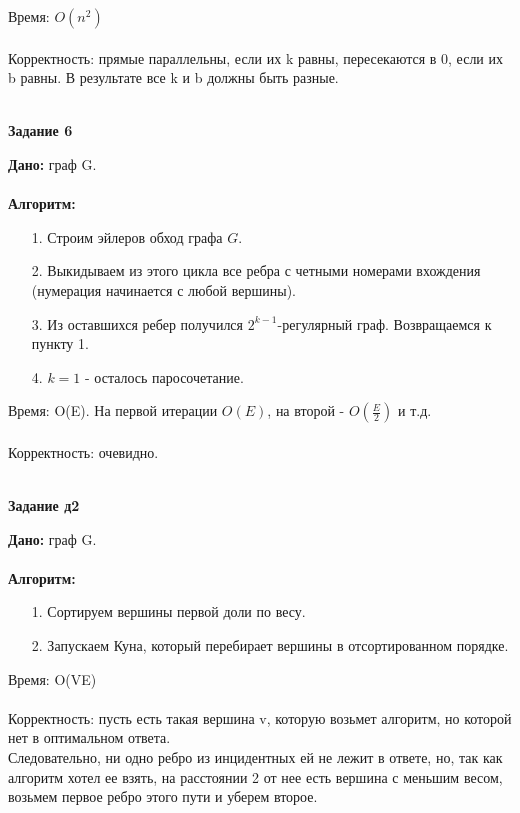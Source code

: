 \documentclass[12pt]{article} %
\begin{document}
	Время: $O(n^2)$\\
	\\
 	Корректность: прямые параллельны, если их k равны, пересекаются в 0, если их b равны. В результате все k и b должны быть разные.\\
 	\\
	\begin{center}
		\textbf{Задание 6}\\
	\end{center}
	\textbf{Дано:} граф G.\\
	\\
	\textbf{Алгоритм:}\\
	\begin{enumerate}
		\item[1.] Строим эйлеров обход графа $G$.
		\item[2.] Выкидываем из этого цикла все ребра с четными номерами вхождения (нумерация начинается с любой 	
			      вершины).
		\item[3.] Из оставшихся ребер получился $2^{k - 1}$-регулярный граф. Возвращаемся к пункту 1.
		\item[4.] $k = 1$ - осталось паросочетание.  
	\end{enumerate}
	Время: O(E). На первой итерации $O(E)$, на второй - $O(\frac{E}{2})$ и т.д.\\
	\\
	Корректность: очевидно.\\
	\\
	\begin{center}
		\textbf{Задание д2}\\
	\end{center}
	\textbf{Дано:} граф G.\\
	\\
	\textbf{Алгоритм:}\\
	\begin{enumerate}
		\item[1.] Сортируем вершины первой доли по весу.
		\item[2.] Запускаем Куна, который перебирает вершины в отсортированном порядке.
	\end{enumerate}
	Время: O(VE)\\
	\\
	Корректность: пусть есть такая вершина v, которую возьмет алгоритм, но которой нет в оптимальном ответа.\\
				  Следовательно, ни одно ребро из инцидентных ей не лежит в ответе, но, так как алгоритм хотел ее взять,
				  на расстоянии 2 от нее есть вершина с меньшим весом, возьмем первое ребро этого пути и уберем второе.
\end{document}
